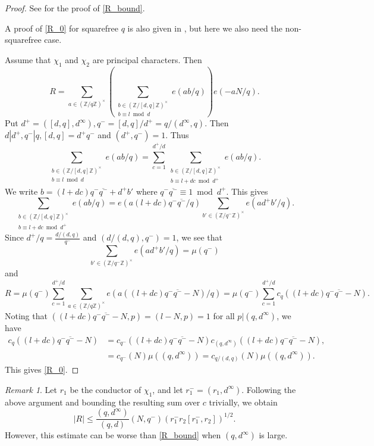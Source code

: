 \documentclass{amsart}
\theoremstyle{definition}
\theoremstyle{remark}
\newtheorem{rem}[dfn]{Remark}
\newcommand{\1}{
    \bm{1}
}
\newcommand{\pZ}[1]{
(\mathbb{Z}/{ #1 \mathbb{Z}})^{\times}
}
\begin{document}
\begin{proof}
See \cite[Lemmas 11.1, 11.2, and 11.3]{maier1990unusually} for the proof of \eqref{R_bound}. 


A proof of \eqref{R_0} for squarefree $q$ is also given in \cite[Section 8]{maier1990unusually}, but here we also need the non-squarefree case. 

Assume that $\chi_1$ and $\chi_2$ are principal characters. Then
\[ R = \sum_{a \in \pZ{q}} \left( \sum_{\substack{b \in \pZ{[d,q]} \\ b \equiv l \bmod d}} e(ab/q) \right) e(-aN/q). \]
Put $d^+=([d,q],d^{\infty}), q^{-}=[d,q]/d^+=q/(d^{\infty},q)$. Then $d|d^+, q^-|q, [d,q]=d^+ q^-$ and $(d^+,q^-)=1$. Thus
\[ \sum_{\substack{b \in \pZ{[d,q]} \\ b \equiv l \bmod d}} e(ab/q) = \sum_{c=1}^{d^+/d} \sum_{\substack{b \in \pZ{[d,q]} \\ b \equiv l+dc \bmod d^+}} e(ab/q). \]
We write $b= (l+dc) q^- \overline{q^-} + d^+ b'$ where $q^- \overline{q^-} \equiv 1 \bmod d^+$. This gives
\[ \sum_{\substack{b \in \pZ{[d,q]} \\ b \equiv l+dc \bmod d^+}} e(ab/q) = e(a (l+dc) q^- \overline{q^-}/q) \sum_{b' \in \pZ{q^-}} e(ad^{+} b'/q). \]
Since $d^+/q=\frac{d/(d,q)}{q^-}$ and $(d/(d,q),q^-)=1$, we see that
\[
\sum_{b' \in \pZ{q^-}} e(ad^{+} b'/q) = \mu(q^-)
\]
and
\[ R = \mu(q^-)  \sum_{c=1}^{d^+/d} \sum_{a \in \pZ{q}} e(a ((l+dc) q^- \overline{q^-}-N)/q) = \mu(q^-)  \sum_{c=1}^{d^+/d} c_q((l+dc) q^- \overline{q^-}-N). \]
Noting that $((l+dc) q^- \overline{q^-}-N,p)=(l-N,p)=1$ for all $p|(q,d^{\infty})$, we have
\begin{align*}
c_q((l+dc) q^- \overline{q^-}-N) &= c_{q^-}((l+dc) q^- \overline{q^-}-N) c_{(q,d^{\infty})}((l+dc) q^- \overline{q^-}-N), \\
&= c_{q^-}(N) \mu((q,d^{\infty})) = c_{q/(d,q)}(N) \mu((q,d^{\infty})). 
\end{align*}
This gives \eqref{R_0}. 
\end{proof}



\begin{rem}
Let $r_1$ be the conductor of $\chi_1$, and let $r^-_1=(r_1,d^{\infty})$. Following the above argument and bounding the resulting sum over $c$ trivially, we obtain
\[ |R| \leq \frac{(q,d^{\infty})}{(q,d)} (N,q^-) (r^-_1 r_2 [r^-_1,r_2])^{1/2}. \]
However, this estimate can be worse than \eqref{R_bound} when $(q,d^\infty)$ is large.
\end{rem}
\end{document}
